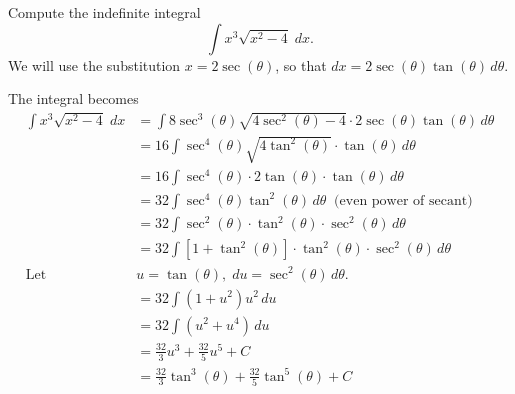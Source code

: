 \documentclass[handout]{ximera}
\begin{document}
\begin{example}[example 5]
Compute the indefinite integral
\[
\int x^3\sqrt{x^2-4} \; dx.
\]
We will use the substitution $x = 2\sec(\theta)$,
so that $dx = 2\sec(\theta)\tan(\theta) \, d\theta$.

The integral becomes
\begin{align*}
\int x^3\sqrt{x^2-4}\; dx &= \int 8\sec^3(\theta)\sqrt{4\sec^2(\theta)-4}\cdot 2\sec(\theta)\tan(\theta)\, d\theta\\[6pt]
                           &=  16\int \sec^4(\theta)\sqrt{4\tan^2(\theta)}\cdot \tan(\theta)\, d\theta\\[6pt]   
                            &=  16\int \sec^4(\theta)\cdot2\tan(\theta)\cdot \tan(\theta)\, d\theta\\[6pt] 
                            &=  32\int \sec^4(\theta)\tan^2(\theta)\, d\theta \;\; \text{(even power of secant)} \\[6pt]
                            &=  32\int  \sec^2(\theta) \cdot \tan^2(\theta)\cdot\sec^2(\theta)\, d\theta\\[6pt]  
                            &=  32\int  [1 + \tan^2(\theta)] \cdot \tan^2(\theta)\cdot\sec^2(\theta)\, d\theta\\[6pt]  
                            \text{Let } \; & u = \tan(\theta), \; du = \sec^2(\theta) \, d\theta.\\[6pt]
                            &=  32\int \left(1 + u^2\right)u^2\, du\\[6pt] 
                             &=  32\int \left(u^2 + u^4\right) \, du\\[6pt]
                             &= \frac{32}{3} u^3 + \frac{32}{5} u^5 + C\\[6pt]
                             &= \frac{32}{3} \tan^3(\theta) + \frac{32}{5} \tan^5(\theta) + C                            
\end{align*}




\begin{image}
\end{image}





\end{example}
\end{document}

